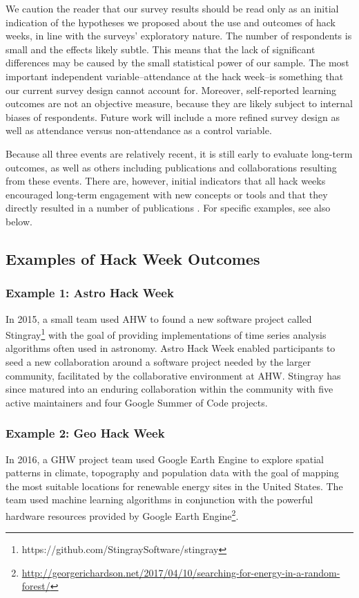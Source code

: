 We caution the reader that our survey results should be read only as an initial indication of the hypotheses we proposed about the use and outcomes of hack weeks, in line with the surveys' exploratory nature. The number of respondents is small and the effects likely subtle. This means that the lack of significant differences may be caused by the small statistical power of our sample. The most important independent variable--attendance at the hack week--is something that our current survey design cannot account for. Moreover, self-reported learning outcomes are not an objective measure, because they are likely subject to internal biases of respondents. Future work will include a more refined survey design as well as attendance versus non-attendance as a control variable.

Because all three events are relatively recent, it is still early to evaluate long-term outcomes, as well as others including publications and collaborations resulting from these events.
There are, however, initial indicators that all hack weeks encouraged long-term engagement with new concepts or tools and that they directly resulted in a number of publications \cite{gullysantiago2015,faria2016,keshavan2017,leonard2017,jordan2017,peterson2017,hahn2017,pricewhelan2017}. For specific examples, see also below.

\subsection*{Examples of Hack Week Outcomes}
\label{sec:outcomes}
\subsubsection*{Example 1: Astro Hack Week}
In 2015, a small team used AHW to found a new software project called Stingray\footnote{https://github.com/StingraySoftware/stingray} with the goal of providing implementations of time series analysis algorithms often used in astronomy.
Astro Hack Week enabled participants to seed a new collaboration around a software project needed by the larger community, facilitated by the collaborative environment at AHW.
Stingray has since matured into an enduring collaboration within the community with five active maintainers and four Google Summer of Code projects.
\subsubsection*{Example 2: Geo Hack Week}
In 2016, a GHW project team used Google Earth Engine to explore spatial patterns in climate, topography and population data with the goal of mapping the most suitable locations for renewable energy sites in the United States.
The team used machine learning algorithms in conjunction with the powerful hardware resources provided by Google Earth Engine\footnote{\url{http://georgerichardson.net/2017/04/10/searching-for-energy-in-a-random-forest/}}.
